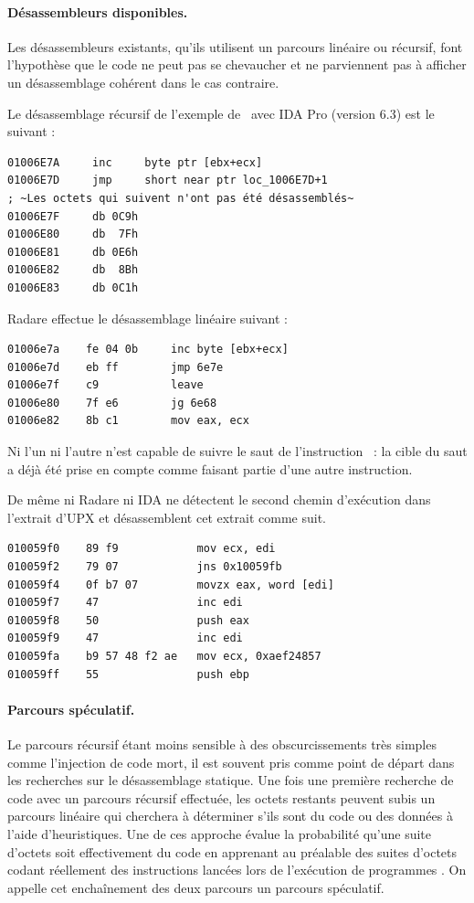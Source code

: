 \paragraph{Désassembleurs disponibles.}
Les désassembleurs existants, qu'ils utilisent un parcours linéaire ou récursif, font l'hypothèse que le code ne peut pas se chevaucher et ne parviennent pas à afficher un désassemblage cohérent dans le cas contraire.

Le désassemblage récursif de l'exemple de \telock\ avec IDA Pro (version 6.3) \cite{IDA} est le suivant :
\begin{lstlisting}[language={[x86masm]Assembler}, escapechar=~]
01006E7A     inc     byte ptr [ebx+ecx]
01006E7D     jmp     short near ptr loc_1006E7D+1
; ~Les octets qui suivent n'ont pas été désassemblés~
01006E7F     db 0C9h
01006E80     db  7Fh
01006E81     db 0E6h
01006E82     db  8Bh
01006E83     db 0C1h
\end{lstlisting}
Radare \cite{radare} effectue le désassemblage linéaire suivant :
\begin{lstlisting}[language={[x86masm]Assembler}, escapechar=~]
01006e7a    fe 04 0b     inc byte [ebx+ecx]
01006e7d    eb ff        jmp 6e7e
01006e7f    c9           leave
01006e80    7f e6        jg 6e68
01006e82    8b c1        mov eax, ecx
\end{lstlisting}
Ni l'un ni l'autre n'est capable de suivre le saut de l'instruction \jmp\ : la cible du saut a déjà été prise en compte comme faisant partie d'une autre instruction.

De même ni Radare ni IDA ne détectent le second chemin d'exécution dans l'extrait d'UPX et désassemblent cet extrait comme suit.
\begin{lstlisting}[language={[x86masm]Assembler}, escapechar=~]
010059f0    89 f9            mov ecx, edi
010059f2    79 07            jns 0x10059fb
010059f4    0f b7 07         movzx eax, word [edi]
010059f7    47               inc edi
010059f8    50               push eax
010059f9    47               inc edi
010059fa    b9 57 48 f2 ae   mov ecx, 0xaef24857
010059ff    55               push ebp
\end{lstlisting}

\paragraph{Parcours spéculatif.}
Le parcours récursif étant moins sensible à des obscurcissements très simples comme l'injection de code mort, il est souvent pris comme point de départ dans les recherches sur le désassemblage statique.
Une fois une première recherche de code avec un parcours récursif effectuée, les octets restants peuvent subis un parcours linéaire qui cherchera à déterminer s'ils sont du code ou des données à l'aide d'heuristiques.
Une de ces approche évalue la probabilité qu'une suite d'octets soit effectivement du code en apprenant au préalable des suites d'octets codant réellement des instructions lancées lors de l'exécution de programmes \cite{KDF09}.
On appelle cet enchaînement des deux parcours un parcours spéculatif.

